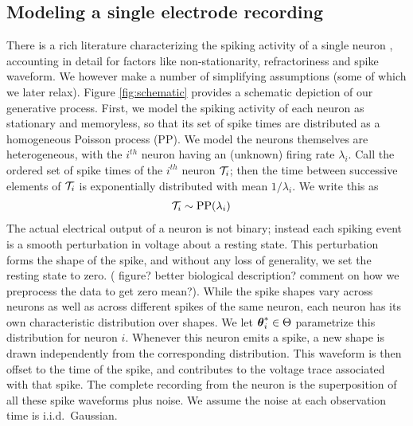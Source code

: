 \vspace{-.1in}
\subsection{Modeling a single electrode recording}
\vspace{-.1in}

There is a rich literature characterizing the spiking activity of a single neuron \citep{?}, accounting in detail for factors like non-stationarity, 
refractoriness and spike waveform. We however make a number of simplifying assumptions (some of which we later relax).
Figure \ref{fig:schematic} provides a schematic depiction of our generative process.
First, we model the spiking activity of each neuron as stationary and memoryless, so that its set of spike times are 
distributed as a homogeneous Poisson process (PP).  %
 We model the neurons themselves are heterogeneous, with the $i^{th}$ neuron having
an (unknown) firing rate $\lambda_i$. Call the ordered set of spike times of the $i^{th}$ neuron $\mathcal{T}_i$; then the time between successive elements of $\mathcal{T}_i$ is 
exponentially distributed with mean $1/\lambda_i$. We write this as
\vspace{-.1in}
\begin{align}
  \mathcal{T}_i &\sim \text{PP}(\lambda_i)
\end{align}
The actual electrical output of a neuron is not binary; instead each spiking event is a smooth perturbation in voltage about a
resting state. This perturbation forms the shape of the spike, and without any loss of generality, we set the resting state to zero. 
{(\color{red} figure? better biological description? comment on how we preprocess the data to get zero mean?)}. 
While the spike shapes vary across neurons as well as across different spikes of the same neuron, each 
neuron has its own characteristic distribution over shapes. 
We let $\boldsymbol{\theta}^*_i \in \Theta$ parametrize this distribution for neuron $i$.
Whenever this neuron emits a 
spike, a new shape is drawn independently from the corresponding distribution. %
This waveform is then offset to the time of the spike, and contributes to the voltage trace associated with that spike. The complete recording from
the neuron is the superposition of all these spike waveforms plus noise.  
We assume the noise at each observation time is i.i.d.\ Gaussian.

